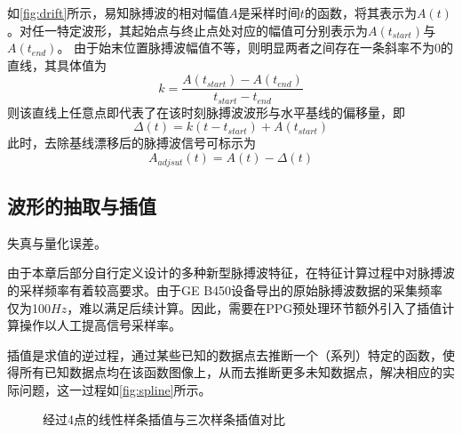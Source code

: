 如\autoref{fig:drift}所示，易知脉搏波的相对幅值$A$是采样时间$t$的函数，将其表示为$A(t)$。对任一特定波形，其起始点与终止点处对应的幅值可分别表示为$A(t_{start})$与$A(t_{end})$。
由于始末位置脉搏波幅值不等，则明显两者之间存在一条斜率不为0的直线，其具体值为
\begin{equation}
    \label{equ:linek}
    k=\frac{A(t_{start})-A(t_{end})}{t_{start}-t_{end}}
\end{equation}
则该直线上任意点即代表了在该时刻脉搏波波形与水平基线的偏移量，即
\begin{equation}
    \label{equ:liney}
    \Delta(t)=k(t-t_{start})+A(t_{start})
\end{equation}
此时，去除基线漂移后的脉搏波信号可标示为
\begin{equation}
    \label{equ:adjusta}
    A_{adjsut}(t)=A(t)-\Delta(t)
\end{equation}

\subsection{波形的抽取与插值}
失真与量化误差。

由于本章后部分自行定义设计的多种新型脉搏波特征，在特征计算过程中对脉搏波的采样频率有着较高要求。由于GE B450设备导出的原始脉搏波数据的采集频率仅为100$Hz$，难以满足后续计算。因此，需要在PPG预处理环节额外引入了插值计算操作以人工提高信号采样率。

插值是求值的逆过程，通过某些已知的数据点去推断一个（系列）特定的函数，使得所有已知数据点均在该函数图像上，从而去推断更多未知数据点，解决相应的实际问题，这一过程如\autoref{fig:spline}所示。
\begin{figure}[htbp]
    \centering
    \quad
    \caption{\label{fig:spline}经过4点的线性样条插值与三次样条插值对比}
\end{figure}

